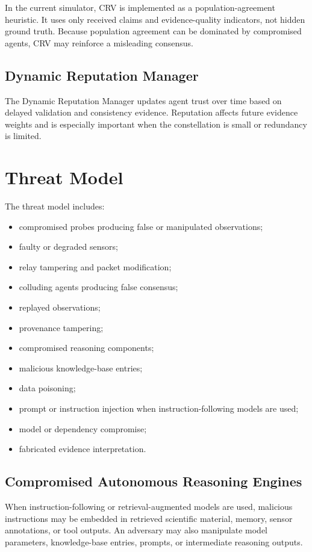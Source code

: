\documentclass[10pt,conference]{IEEEtran}
\begin{document}
In the current simulator, CRV is implemented as a population-agreement heuristic. It uses only received claims and evidence-quality indicators, not hidden ground truth. Because population agreement can be dominated by compromised agents, CRV may reinforce a misleading consensus.

\subsection{Dynamic Reputation Manager}

The Dynamic Reputation Manager updates agent trust over time based on delayed validation and consistency evidence. Reputation affects future evidence weights and is especially important when the constellation is small or redundancy is limited.

\section{Threat Model}
\label{sec:threats}

The threat model includes:

\begin{itemize}
  \item compromised probes producing false or manipulated observations;
  \item faulty or degraded sensors;
  \item relay tampering and packet modification;
  \item colluding agents producing false consensus;
  \item replayed observations;
  \item provenance tampering;
  \item compromised reasoning components;
  \item malicious knowledge-base entries;
  \item data poisoning;
  \item prompt or instruction injection when instruction-following models are used;
  \item model or dependency compromise;
  \item fabricated evidence interpretation.
\end{itemize}

\subsection{Compromised Autonomous Reasoning Engines}

When instruction-following or retrieval-augmented models are used, malicious instructions may be embedded in retrieved scientific material, memory, sensor annotations, or tool outputs. An adversary may also manipulate model parameters, knowledge-base entries, prompts, or intermediate reasoning outputs.
\end{document}
